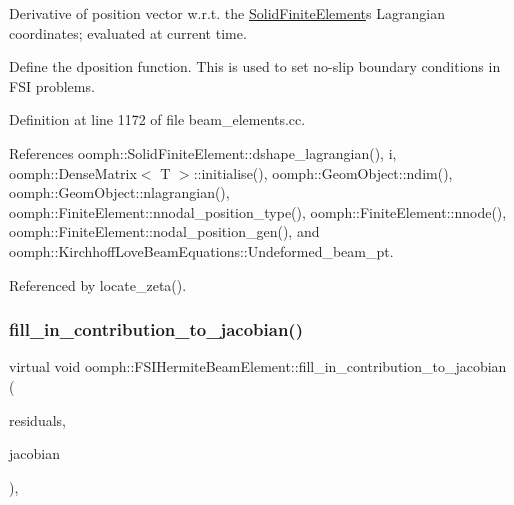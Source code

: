 Derivative of position vector w.\+r.\+t. the \hyperlink{classoomph_1_1SolidFiniteElement}{Solid\+Finite\+Element}\textquotesingle{}s Lagrangian coordinates; evaluated at current time. 

Define the dposition function. This is used to set no-\/slip boundary conditions in F\+SI problems. 

Definition at line 1172 of file beam\+\_\+elements.\+cc.



References oomph\+::\+Solid\+Finite\+Element\+::dshape\+\_\+lagrangian(), i, oomph\+::\+Dense\+Matrix$<$ T $>$\+::initialise(), oomph\+::\+Geom\+Object\+::ndim(), oomph\+::\+Geom\+Object\+::nlagrangian(), oomph\+::\+Finite\+Element\+::nnodal\+\_\+position\+\_\+type(), oomph\+::\+Finite\+Element\+::nnode(), oomph\+::\+Finite\+Element\+::nodal\+\_\+position\+\_\+gen(), and oomph\+::\+Kirchhoff\+Love\+Beam\+Equations\+::\+Undeformed\+\_\+beam\+\_\+pt.



Referenced by locate\+\_\+zeta().

\mbox{\label{classoomph_1_1FSIHermiteBeamElement_ab81052ae3c54d8387f0d8cd485cf156f}} 
\subsubsection{\texorpdfstring{fill\+\_\+in\+\_\+contribution\+\_\+to\+\_\+jacobian()}{fill\_in\_contribution\_to\_jacobian()}}
{\footnotesize\ttfamily virtual void oomph\+::\+F\+S\+I\+Hermite\+Beam\+Element\+::fill\+\_\+in\+\_\+contribution\+\_\+to\+\_\+jacobian (\begin{DoxyParamCaption}\item[{\hyperlink{classoomph_1_1Vector}{Vector}$<$ double $>$ \&}]{residuals,  }\item[{\hyperlink{classoomph_1_1DenseMatrix}{Dense\+Matrix}$<$ double $>$ \&}]{jacobian }\end{DoxyParamCaption})\hspace{0.3cm}{\ttfamily [inline]}, {\ttfamily [virtual]}}



